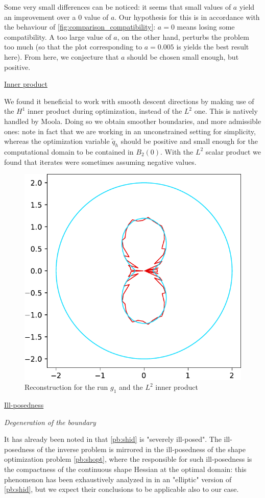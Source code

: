\documentclass[english,a4paper,9pt,oneside]{scrbook}	%
\theoremstyle{break}
\theoremstyle{remark}
\begin{document}
Some very small differences can be noticed: it seems that small values of $a$ yield an improvement over a $0$ value of $a$. Our hypothesis for this is in accordance with the behaviour of \cref{fig:comparison_compatibility}: $a=0$ means losing some compatibility. A too large value of $a$, on the other hand, perturbs the problem too much (so that the plot corresponding to $a=0.005$ is yields the best result here). From here, we conjecture that $a$ should be chosen small enough, but positive.


\underline{Inner product}

We found it beneficial to work with smooth descent directions by making use of the $H^1$ inner product during optimization, instead of the $L^2$ one. This is natively handled by Moola. Doing so we obtain smoother boundaries, and more admissible ones: note in fact that we are working in an unconstrained setting for simplicity, whereas the optimization variable $\tilde{q}_h$ should be positive and small enough for the computational domain to be contained in $B_{2}(0)$. With the $L^2$ scalar product we found that iterates were sometimes assuming negative values.

\begin{figure}[H]
\centering
\includegraphics[height=0.3\columnwidth]{Images/hourglass_constant_l2/comparison.pdf}
\caption{Reconstruction for the run $g_1$ and the $L^2$ inner product}\label{fig:l2}
\end{figure}


\underline{Ill-posedness}

\textit{Degeneration of the boundary}

It has already been noted in \cite{harbrecht} that \cref{pb:shid} is "severely ill-posed". The ill-posedness of the inverse problem is mirrored in the ill-posedness of the shape optimization problem \cref{pb:shopt}, where the responsible for such ill-posedness is the compactness of the continuous shape Hessian at the optimal domain: this phenomenon has been exhaustively analyzed in \cite{eppler} in an "elliptic" version of \cref{pb:shid}, but we expect their conclusions to be applicable also to our case.
\end{document}

